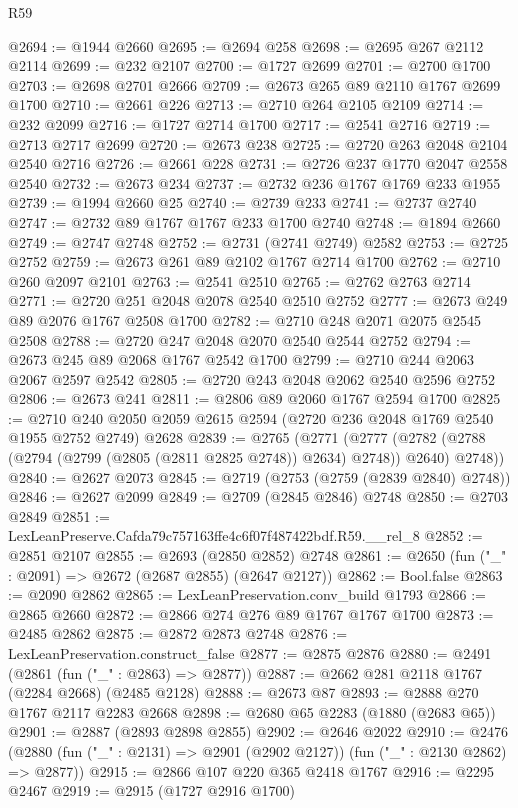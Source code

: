 \begin{lexlean}{R59}
\begin{coremodule}
@2694 := @1944 @2660
@2695 := @2694 @258
@2698 := @2695 @267 @2112 @2114
@2699 := @232 @2107
@2700 := @1727 @2699
@2701 := @2700 @1700
@2703 := @2698 @2701 @2666
@2709 := @2673 @265 @89 @2110 @1767 @2699 @1700
@2710 := @2661 @226
@2713 := @2710 @264 @2105 @2109
@2714 := @232 @2099
@2716 := @1727 @2714 @1700
@2717 := @2541 @2716
@2719 := @2713 @2717 @2699
@2720 := @2673 @238
@2725 := @2720 @263 @2048 @2104 @2540 @2716
@2726 := @2661 @228
@2731 := @2726 @237 @1770 @2047 @2558 @2540
@2732 := @2673 @234
@2737 := @2732 @236 @1767 @1769 @233 @1955
@2739 := @1994 @2660 @25
@2740 := @2739 @233
@2741 := @2737 @2740
@2747 := @2732 @89 @1767 @1767 @233 @1700 @2740
@2748 := @1894 @2660
@2749 := @2747 @2748
@2752 := @2731 (@2741 @2749) @2582
@2753 := @2725 @2752
@2759 := @2673 @261 @89 @2102 @1767 @2714 @1700
@2762 := @2710 @260 @2097 @2101
@2763 := @2541 @2510
@2765 := @2762 @2763 @2714
@2771 := @2720 @251 @2048 @2078 @2540 @2510 @2752
@2777 := @2673 @249 @89 @2076 @1767 @2508 @1700
@2782 := @2710 @248 @2071 @2075 @2545 @2508
@2788 := @2720 @247 @2048 @2070 @2540 @2544 @2752
@2794 := @2673 @245 @89 @2068 @1767 @2542 @1700
@2799 := @2710 @244 @2063 @2067 @2597 @2542
@2805 := @2720 @243 @2048 @2062 @2540 @2596 @2752
@2806 := @2673 @241
@2811 := @2806 @89 @2060 @1767 @2594 @1700
@2825 := @2710 @240 @2050 @2059 @2615 @2594 (@2720 @236 @2048 @1769 @2540 @1955 @2752 @2749) @2628
@2839 := @2765
    (@2771
      (@2777 (@2782 (@2788 (@2794 (@2799 (@2805 (@2811 @2825 @2748)) @2634) @2748)) @2640) @2748))
@2840 := @2627 @2073
@2845 := @2719 (@2753 (@2759 (@2839 @2840) @2748))
@2846 := @2627 @2099
@2849 := @2709 (@2845 @2846) @2748
@2850 := @2703 @2849
@2851 := LexLeanPreserve.Cafda79c757163ffe4c6f07f487422bdf.R59.__rel_8
@2852 := @2851 @2107
@2855 := @2693 (@2850 @2852) @2748
@2861 := @2650 (fun ("_" : @2091) => @2672 (@2687 @2855) (@2647 @2127))
@2862 := Bool.false
@2863 := @2090 @2862
@2865 := LexLeanPreservation.conv_build @1793
@2866 := @2865 @2660
@2872 := @2866 @274 @276 @89 @1767 @1767 @1700
@2873 := @2485 @2862
@2875 := @2872 @2873 @2748
@2876 := LexLeanPreservation.construct_false
@2877 := @2875 @2876
@2880 := @2491 (@2861 (fun ("_" : @2863) => @2877))
@2887 := @2662 @281 @2118 @1767 (@2284 @2668) (@2485 @2128)
@2888 := @2673 @87
@2893 := @2888 @270 @1767 @2117 @2283 @2668
@2898 := @2680 @65 @2283 (@1880 (@2683 @65))
@2901 := @2887 (@2893 @2898 @2855)
@2902 := @2646 @2022
@2910 := @2476 (@2880 (fun ("_" : @2131) => @2901 (@2902 @2127)) (fun ("_" : @2130 @2862) => @2877))
@2915 := @2866 @107 @220 @365 @2418 @1767
@2916 := @2295 @2467
@2919 := @2915 (@1727 @2916 @1700)

\end{coremodule}
\end{lexlean}

